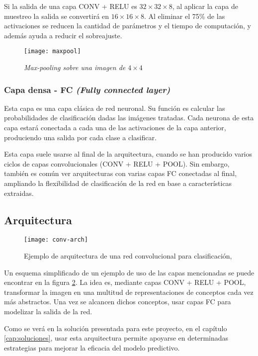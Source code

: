 Si la salida de una capa CONV + RELU es $32 \times 32 \times 8$, al aplicar la capa de muestreo la salida se convertirá en $16 \times 16 \times 8$. Al eliminar el 75\% de las activaciones se reducen la cantidad de parámetros y el tiempo de computación, y además ayuda a reducir el sobreajuste.

\begin{figure}
    \centering
    \caption{\textit{Max-pooling sobre una imagen de $4\times4$}}
  \label{maxpool}
  \texttt{[image: maxpool]}
\end{figure}

\subsubsection{Capa densa - FC \textit{(Fully connected layer)}}

Esta capa es una capa clásica de red neuronal. Su función es calcular las probabilidades de clasificación dadas las imágenes tratadas. Cada neurona de esta capa estará conectada a cada una de las activaciones de la capa anterior, produciendo una salida por cada clase a clasificar.

Esta capa suele usarse al final de la arquitectura, cuando se han producido varios ciclos de capas convolucionales (CONV + RELU + POOL). Sin embargo, también es común ver arquitecturas con varias capas FC conectadas al final, ampliando la flexibilidad de clasificación de la red en base a características extraidas.

\subsection{Arquitectura}
\label{sec:conv-net-arch}

\begin{figure}
    \centering
    \caption{Ejemplo de arquitectura de una red convolucional para clasificación, \parencite{clarifai}}
\label{conv-arch}
  \texttt{[image: conv-arch]}
\end{figure}

Un esquema simplificado de un ejemplo de uso de las capas mencionadas se puede encontrar en la figura \ref{conv-arch}. La idea es, mediante capas CONV + RELU + POOL, transformar la imagen en una multitud de representaciones de conceptos cada vez más abstractos. Una vez se alcancen dichos conceptos, usar capas FC para modelizar la salida de la red.

Como se verá en la solución presentada para este proyecto, en el capítulo \ref{cap:soluciones}, usar esta arquitectura permite apoyarse en determinadas estrategias para mejorar la eficacia del modelo predictivo.
